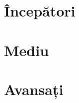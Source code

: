 \documentclass{roalgo}
\begin{document}


\frontmatter
\tableofcontents
\mainmatter

\part{Începători}
% 

\part{Mediu}
% 
% 
% 

\part{Avansați}
\end{document}
